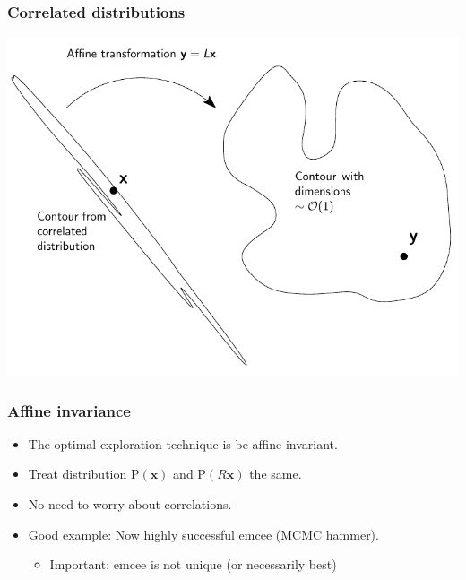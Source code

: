 \documentclass[]{beamer}
\newcommand{\prob}{\mathrm{P}}
\begin{document}
\begin{frame}
  \frametitle{Correlated distributions}

  \includegraphics[width=\textwidth]{figures/contour_transform}

\end{frame}

\begin{frame}
  \frametitle{Affine invariance}
  \begin{itemize}
    \pause\item The optimal exploration technique is be affine invariant.
    \pause\item Treat distribution $\prob(\mathbf{x})$ and $\prob(R \mathbf{x})$ the same.
    \pause\item No need to worry about correlations.
    \pause\item Good example: Now highly successful emcee (MCMC hammer).
      \begin{itemize}
        \item Important: emcee is not unique (or necessarily best)
      \end{itemize}
  \end{itemize}
\end{frame}



\end{document}

